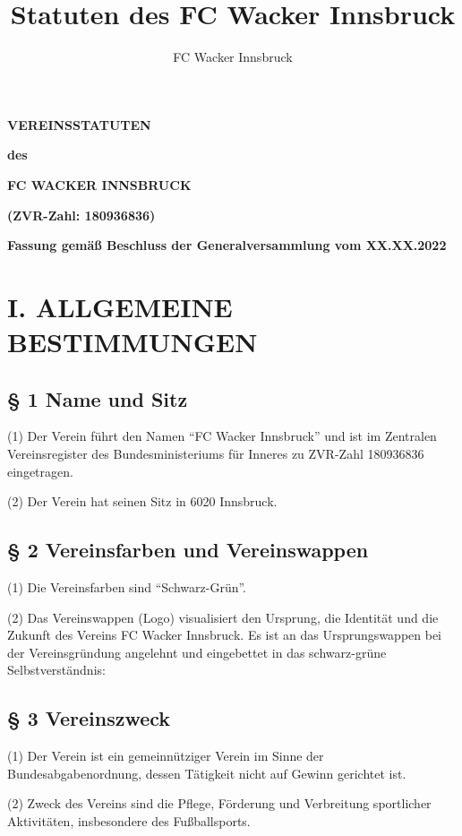 \documentclass[11pt,a4paper]{article}
\author{FC Wacker Innsbruck}
\title{Statuten des FC Wacker Innsbruck}
\begin{document}
\setlength{\parskip}{25pt}
\setcounter{secnumdepth}{0}
\centering

\textbf{\huge VEREINSSTATUTEN}

\textbf{des}

\textbf{\huge FC WACKER INNSBRUCK}

\textbf{(ZVR-Zahl: 180936836)}

\vspace{100ex}

\textbf{Fassung gemäß Beschluss der Generalversammlung vom XX.XX.2022}

\clearpage
\flushleft
\setlength{\parskip}{10pt}

\tableofcontents

\clearpage

\section{I. ALLGEMEINE BESTIMMUNGEN}

\subsection{§ 1
Name und Sitz}

(1)
Der Verein führt den Namen "`FC Wacker Innsbruck"' und ist im Zentralen Vereinsregister des Bundesministeriums für Inneres zu ZVR-Zahl 180936836 eingetragen.

(2)
Der Verein hat seinen Sitz in 6020 Innsbruck.

\subsection{§ 2
Vereinsfarben und Vereinswappen}

(1)
Die Vereinsfarben sind "`Schwarz-Grün"'.

(2)
Das Vereinswappen (Logo) visualisiert den Ursprung, die Identität und die Zukunft des Vereins FC Wacker Innsbruck.
Es ist an das Ursprungswappen bei der Vereinsgründung angelehnt und eingebettet in das schwarz-grüne Selbstverständnis:

\subsection{§ 3
Vereinszweck}

(1)
Der Verein ist ein gemeinnütziger Verein im Sinne der Bundesabgabenordnung, dessen Tätigkeit nicht auf Gewinn gerichtet ist.

(2)
Zweck des Vereins sind die Pflege, Förderung und Verbreitung sportlicher Aktivitäten, insbesondere des Fußballsports.
\end{document}
